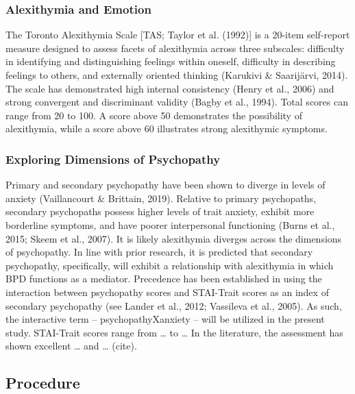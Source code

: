\documentclass[
  man,floatsintext]{apa7}
\begin{document}
\hypertarget{alexithymia-and-emotion}{%
\subsubsection{Alexithymia and Emotion}\label{alexithymia-and-emotion}}

The Toronto Alexithymia Scale {[}TAS; Taylor et al. (1992){]} is a 20-item self-report measure designed to assess facets of alexithymia across three subscales: difficulty in identifying and distinguishing feelings within oneself, difficulty in describing feelings to others, and externally oriented thinking (Karukivi \& Saarijärvi, 2014). The scale has demonstrated high internal consistency (Henry et al., 2006) and strong convergent and discriminant validity (Bagby et al., 1994). Total scores can range from 20 to 100. A score above 50 demonstrates the possibility of alexithymia, while a score above 60 illustrates strong alexithymic symptoms.

\hypertarget{exploring-dimensions-of-psychopathy}{%
\subsubsection{Exploring Dimensions of Psychopathy}\label{exploring-dimensions-of-psychopathy}}

Primary and secondary psychopathy have been shown to diverge in levels of anxiety (Vaillancourt \& Brittain, 2019). Relative to primary psychopaths, secondary psychopaths possess higher levels of trait anxiety, exhibit more borderline symptoms, and have poorer interpersonal functioning (Burns et al., 2015; Skeem et al., 2007). It is likely alexithymia diverges across the dimensions of psychopathy. In line with prior research, it is predicted that secondary psychopathy, specifically, will exhibit a relationship with alexithymia in which BPD functions as a mediator. Precedence has been established in using the interaction between psychopathy scores and STAI-Trait scores as an index of secondary psychopathy (see Lander et al., 2012; Vassileva et al., 2005). As such, the interactive term -- psychopathyXanxiety -- will be utilized in the present study. STAI-Trait scores range from \ldots{} to \ldots{} In the literature, the assessment has shown excellent \ldots{} and \ldots{} (cite).

\hypertarget{procedure}{%
\subsection{Procedure}\label{procedure}}
\end{document}
